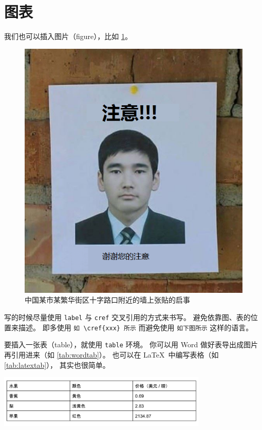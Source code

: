 \documentclass{article}
\def\code{\lstinline}
\begin{document}
\section{图表}

我们也可以插入图片（figure），比如 \cref{fig:attention}。
\begin{figure}[htpb]
    \centering
    \includegraphics[width=0.8\linewidth]{pics/thanks-for-your-attention.png}
    \caption{中国某市某繁华街区十字路口附近的墙上张贴的启事}
    \label{fig:attention}
\end{figure}
写的时候尽量使用 \code`label` 与 \code`cref` 交叉引用的方式来书写。
避免依靠图、表的位置来描述。
即多使用 \code`如 \cref{xxx} 所示`
而避免使用 \code`如下图所示`
这样的语言。

要插入一张表（table），就使用 \code`table` 环境。
你可以用 Word 做好表导出成图片再引用进来（如 \cref{tab:wordtab}）。
也可以在 \LaTeX\ 中编写表格（如 \cref{tab:latextab}），
其实也很简单。

\begin{table}[htpb]
    \centering
    \caption{%
        这张表是用 Google Doc 制作、再作为图片的形式导入进来的。
    }
    \label{tab:wordtab}
    \includegraphics[width=10cm]{pics/fruit-specs.png}
\end{table}
\end{document}

